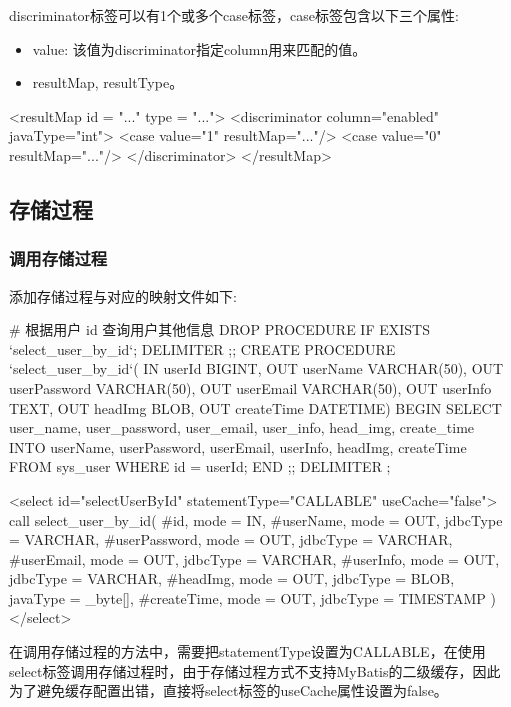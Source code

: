 discriminator标签可以有1个或多个case标签，case标签包含以下三个属性:
\begin{itemize}
    \item value: 该值为discriminator指定column用来匹配的值。
    \item resultMap, resultType。
\end{itemize}

\begin{xml}
<resultMap id = "..." type = "...">
    <discriminator column="enabled" javaType="int">
        <case value="1" resultMap="..."/>
        <case value="0" resultMap="..."/>
    </discriminator>
</resultMap>
\end{xml}

\subsection{存储过程}

\subsubsection{调用存储过程}

添加存储过程与对应的映射文件如下:

\begin{sql}
# 根据用户 id 查询用户其他信息
DROP PROCEDURE IF EXISTS `select_user_by_id`;
DELIMITER ;;
CREATE PROCEDURE `select_user_by_id`(
    IN userId BIGINT,
    OUT userName VARCHAR(50),
    OUT userPassword VARCHAR(50),
    OUT userEmail VARCHAR(50),
    OUT userInfo TEXT,
    OUT headImg BLOB,
    OUT createTime DATETIME)
BEGIN
    SELECT user_name, user_password, user_email, user_info, head_img, create_time
    INTO userName, userPassword, userEmail, userInfo, headImg, createTime
    FROM sys_user
    WHERE id = userId;
END ;;
DELIMITER ;
\end{sql}

\begin{xml}
<select id="selectUserById" statementType="CALLABLE" useCache="false">
    {call select_user_by_id(
        #{id, mode = IN},
        #{userName, mode = OUT, jdbcType = VARCHAR},
        #{userPassword, mode = OUT, jdbcType = VARCHAR},
        #{userEmail, mode = OUT, jdbcType = VARCHAR},
        #{userInfo, mode = OUT, jdbcType = VARCHAR},
        #{headImg, mode = OUT, jdbcType = BLOB, javaType = _byte[]},
        #{createTime, mode = OUT, jdbcType = TIMESTAMP}
    )}
</select>
\end{xml}

在调用存储过程的方法中，需要把statementType设置为CALLABLE，在使用select标签调用存储过程时，由于存储过程方式不支持MyBatis的二级缓存，因此为了避免缓存配置出错，直接将select标签的useCache属性设置为false。

